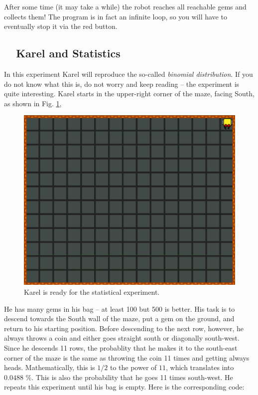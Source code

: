 \noindent
After some time (it may take a while) 
the robot reaches all reachable gems and collects them! The program is in fact 
an infinite loop, so you will have to eventually stop it via the red button.
\noindent

\subsection{\ \ Karel and Statistics}

In this experiment Karel will reproduce the so-called {\em binomial distribution}. 
If you do not know what this is, do not worry and keep reading -- the experiment 
is quite interesting. Karel starts in the upper-right corner of the maze, facing
South, as shown in Fig. \ref{fig:binomial},

\begin{figure}[!ht]
\begin{center}
\includegraphics[width=14cm]{img/binomial.png}
\vspace{-0mm}
\caption{Karel is ready for the statistical experiment.}
\label{fig:binomial}
\end{center}
\end{figure}

\noindent
He has many gems in his bag -- at least 100 but 500 is better. His task is to 
descend towards the South wall of the maze, put a gem on the ground, and 
return to his starting position. Before descending to the next row, however, he 
always throws a coin and either goes straight south or diagonally south-west. 
Since he descends 11 rows, the probablity that he makes it to the south-east
corner of the maze is the same as throwing the coin 11 times and getting 
always heads. Mathematically, this is $1/2$ to the power of $11$, which translates 
into $0.0488$ \%. This is also the probability that he goes 11 times south-west.
He repeats this experiment until his bag is empty.
Here is the corresponding code:\\

